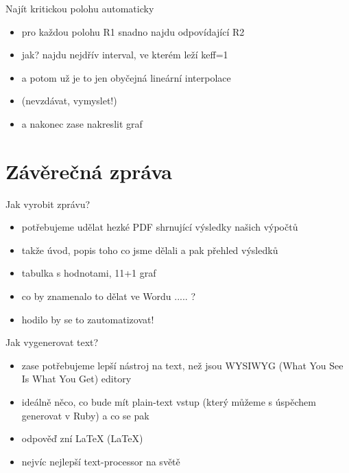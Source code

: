 \documentclass{beamer}
\begin{document}
\begin{frame}{Najít kritickou polohu automaticky}
  \begin{itemize}
    \item pro každou polohu R1 snadno najdu odpovídající R2
    \item jak? najdu nejdřív interval, ve kterém leží keff=1
    \item a potom už je to jen obyčejná lineární interpolace
    \item (nevzdávat, vymyslet!)
    \item a nakonec zase nakreslit graf
  \end{itemize}
\end{frame}

\section{Závěrečná zpráva}

\begin{frame}{Jak vyrobit zprávu?}
  \begin{itemize}
    \item potřebujeme udělat hezké PDF shrnující výsledky našich výpočtů
    \item takže úvod, popis toho co jsme dělali a pak přehled výsledků
    \item tabulka s hodnotami, 11+1 graf
    \item co by znamenalo to dělat ve Wordu ..... ?
    \item hodilo by se to zautomatizovat!
  \end{itemize}
\end{frame}

\begin{frame}{Jak vygenerovat text?}
  \begin{itemize}
    \item zase potřebujeme lepší nástroj na text, než jsou WYSIWYG (What You See Is What You Get) editory
    \item ideálně něco, co bude mít plain-text vstup (který můžeme s úspěchem generovat v Ruby) a co se pak
    \item odpověď zní LaTeX (\LaTeX)
    \item nejvíc nejlepší text-processor na světě
  \end{itemize}
\end{frame}
\end{document}
